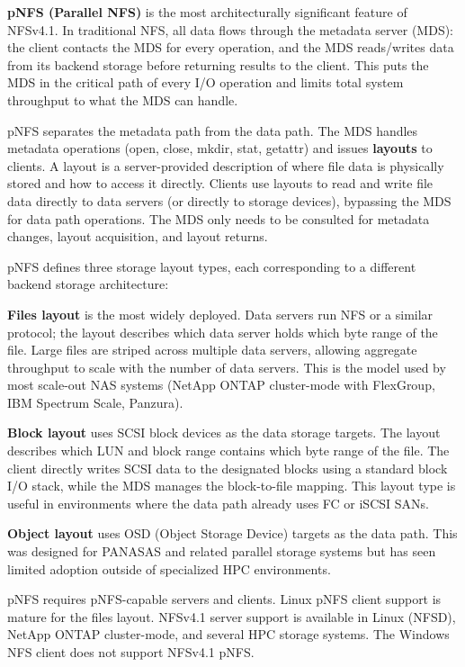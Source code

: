 \textbf{pNFS (Parallel NFS)} is the most architecturally significant feature of NFSv4.1. In traditional NFS, all data flows through the metadata server (MDS): the client contacts the MDS for every operation, and the MDS reads/writes data from its backend storage before returning results to the client. This puts the MDS in the critical path of every I/O operation and limits total system throughput to what the MDS can handle.

pNFS separates the metadata path from the data path. The MDS handles metadata operations (open, close, mkdir, stat, getattr) and issues \textbf{layouts} to clients. A layout is a server-provided description of where file data is physically stored and how to access it directly. Clients use layouts to read and write file data directly to data servers (or directly to storage devices), bypassing the MDS for data path operations. The MDS only needs to be consulted for metadata changes, layout acquisition, and layout returns.

pNFS defines three storage layout types, each corresponding to a different backend storage architecture:

\textbf{Files layout} is the most widely deployed. Data servers run NFS or a similar protocol; the layout describes which data server holds which byte range of the file. Large files are striped across multiple data servers, allowing aggregate throughput to scale with the number of data servers. This is the model used by most scale-out NAS systems (NetApp ONTAP cluster-mode with FlexGroup, IBM Spectrum Scale, Panzura).

\textbf{Block layout} uses SCSI block devices as the data storage targets. The layout describes which LUN and block range contains which byte range of the file. The client directly writes SCSI data to the designated blocks using a standard block I/O stack, while the MDS manages the block-to-file mapping. This layout type is useful in environments where the data path already uses FC or iSCSI SANs.

\textbf{Object layout} uses OSD (Object Storage Device) targets as the data path. This was designed for PANASAS and related parallel storage systems but has seen limited adoption outside of specialized HPC environments.

pNFS requires pNFS-capable servers and clients. Linux pNFS client support is mature for the files layout. NFSv4.1 server support is available in Linux (NFSD), NetApp ONTAP cluster-mode, and several HPC storage systems. The Windows NFS client does not support NFSv4.1 pNFS.

